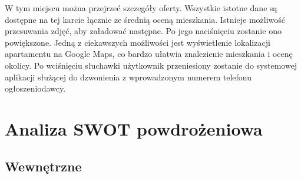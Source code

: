 \documentclass[polish, 11pt]{article}
\begin{document}
        W tym miejscu można przejrzeć szczegóły oferty. Wszystkie istotne dane są dostępne na tej karcie łącznie ze średnią oceną mieszkania. Istnieje możliwość przesuwania zdjęć, aby załadować następne. Po jego naciśnięciu zostanie ono powiększone. Jedną z ciekawszych możliwości jest wyświetlenie lokalizacji apartamentu na Google Maps, co bardzo ułatwia znalezienie mieszkania i ocenę okolicy. Po wciśnięciu słuchawki użytkownik przeniesiony zostanie do systemowej aplikacji służącej do dzwonienia z wprowadzonym numerem telefonu ogłoszeniodawcy.
        
\section{Analiza SWOT powdrożeniowa}
    \subsection{Wewnętrzne}
\end{document}
